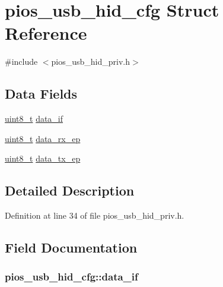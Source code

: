 \hypertarget{structpios__usb__hid__cfg}{\section{pios\-\_\-usb\-\_\-hid\-\_\-cfg Struct Reference}
\label{structpios__usb__hid__cfg}
}


{\ttfamily \#include $<$pios\-\_\-usb\-\_\-hid\-\_\-priv.\-h$>$}

\subsection*{Data Fields}
\begin{DoxyCompactItemize}
\item 
\hyperlink{stdint_8h_aba7bc1797add20fe3efdf37ced1182c5}{uint8\-\_\-t} \hyperlink{structpios__usb__hid__cfg_abd31d71097757582b57064851a5c576a}{data\-\_\-if}
\item 
\hyperlink{stdint_8h_aba7bc1797add20fe3efdf37ced1182c5}{uint8\-\_\-t} \hyperlink{structpios__usb__hid__cfg_a9e2b92a09aa1fefba09f5668d00e2ef7}{data\-\_\-rx\-\_\-ep}
\item 
\hyperlink{stdint_8h_aba7bc1797add20fe3efdf37ced1182c5}{uint8\-\_\-t} \hyperlink{structpios__usb__hid__cfg_a700e6e6591adae231e06b05411cb321b}{data\-\_\-tx\-\_\-ep}
\end{DoxyCompactItemize}


\subsection{Detailed Description}


Definition at line 34 of file pios\-\_\-usb\-\_\-hid\-\_\-priv.\-h.



\subsection{Field Documentation}
\hypertarget{structpios__usb__hid__cfg_abd31d71097757582b57064851a5c576a}{
\subsubsection[{data\-\_\-if}]{ pios\-\_\-usb\-\_\-hid\-\_\-cfg\-::data\-\_\-if}}\label{structpios__usb__hid__cfg_abd31d71097757582b57064851a5c576a}


